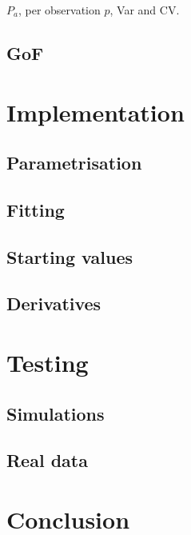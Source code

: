 $P_a$, per observation $p$, Var and CV.

\subsection{GoF}

\section{Implementation}

\subsection{Parametrisation}

\subsection{Fitting}

\subsection{Starting values}

\subsection{Derivatives}



\section{Testing}

\subsection{Simulations}

\subsection{Real data}


\section{Conclusion}